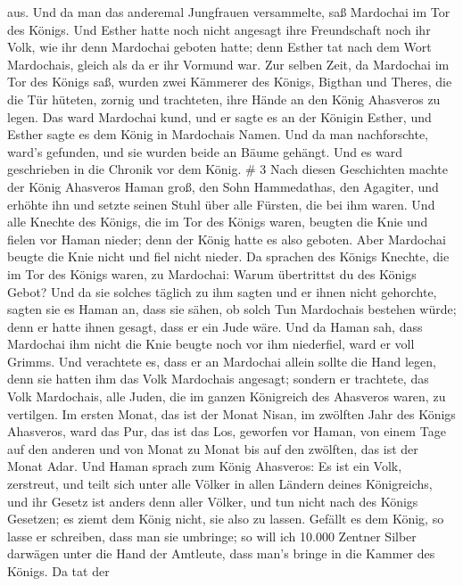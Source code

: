 aus.  Und da man das anderemal Jungfrauen versammelte, saß
Mardochai im Tor des Königs.  Und Esther hatte noch nicht
angesagt ihre Freundschaft noch ihr Volk, wie ihr denn Mardochai geboten
hatte; denn Esther tat nach dem Wort Mardochais, gleich als da er ihr
Vormund war.  Zur selben Zeit, da Mardochai im Tor des
Königs saß, wurden zwei Kämmerer des Königs, Bigthan und Theres, die die
Tür hüteten, zornig und trachteten, ihre Hände an den König Ahasveros zu
legen.  Das ward Mardochai kund, und er sagte es an der
Königin Esther, und Esther sagte es dem König in Mardochais Namen.
 Und da man nachforschte, ward's gefunden, und sie wurden
beide an Bäume gehängt. Und es ward geschrieben in die Chronik vor dem
König. \# 3  Nach diesen Geschichten machte der König
Ahasveros Haman groß, den Sohn Hammedathas, den Agagiter, und erhöhte
ihn und setzte seinen Stuhl über alle Fürsten, die bei ihm waren.
 Und alle Knechte des Königs, die im Tor des Königs waren,
beugten die Knie und fielen vor Haman nieder; denn der König hatte es
also geboten. Aber Mardochai beugte die Knie nicht und fiel nicht
nieder.  Da sprachen des Königs Knechte, die im Tor des
Königs waren, zu Mardochai: Warum übertrittst du des Königs Gebot?
 Und da sie solches täglich zu ihm sagten und er ihnen nicht
gehorchte, sagten sie es Haman an, dass sie sähen, ob solch Tun
Mardochais bestehen würde; denn er hatte ihnen gesagt, dass er ein Jude
wäre.  Und da Haman sah, dass Mardochai ihm nicht die Knie
beugte noch vor ihm niederfiel, ward er voll Grimms.  Und
verachtete es, dass er an Mardochai allein sollte die Hand legen, denn
sie hatten ihm das Volk Mardochais angesagt; sondern er trachtete, das
Volk Mardochais, alle Juden, die im ganzen Königreich des Ahasveros
waren, zu vertilgen.  Im ersten Monat, das ist der Monat
Nisan, im zwölften Jahr des Königs Ahasveros, ward das Pur, das ist das
Los, geworfen vor Haman, von einem Tage auf den anderen und von Monat zu
Monat bis auf den zwölften, das ist der Monat Adar.  Und
Haman sprach zum König Ahasveros: Es ist ein Volk, zerstreut, und teilt
sich unter alle Völker in allen Ländern deines Königreichs, und ihr
Gesetz ist anders denn aller Völker, und tun nicht nach des Königs
Gesetzen; es ziemt dem König nicht, sie also zu lassen. 
Gefällt es dem König, so lasse er schreiben, dass man sie umbringe; so
will ich 10.000 Zentner Silber darwägen unter die Hand der Amtleute,
dass man's bringe in die Kammer des Königs.  Da tat der
